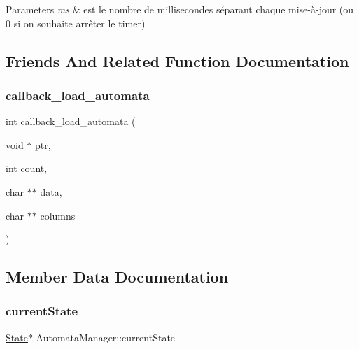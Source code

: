 \begin{DoxyParams}{Parameters}
{\em ms} & est le nombre de millisecondes séparant chaque mise-\/à-\/jour (ou 0 si on souhaite arrêter le timer) \\
\hline
\end{DoxyParams}


\subsection{Friends And Related Function Documentation}
\mbox{\label{class_automata_manager_a9c75102ca101e7ce8ae9d2c5821b1dbf}} 
\subsubsection{\texorpdfstring{callback\+\_\+load\+\_\+automata}{callback\_load\_automata}}
{\footnotesize\ttfamily int callback\+\_\+load\+\_\+automata (\begin{DoxyParamCaption}\item[{void $\ast$}]{ptr,  }\item[{int}]{count,  }\item[{char $\ast$$\ast$}]{data,  }\item[{char $\ast$$\ast$}]{columns }\end{DoxyParamCaption})\hspace{0.3cm}{\ttfamily [friend]}}



\subsection{Member Data Documentation}
\mbox{\label{class_automata_manager_ade5741f667ba5819cdd2621f502ae027}} 
\subsubsection{\texorpdfstring{current\+State}{currentState}}
{\footnotesize\ttfamily \mbox{\hyperlink{class_state}{State}}$\ast$ Automata\+Manager\+::current\+State\hspace{0.3cm}{\ttfamily [private]}}



